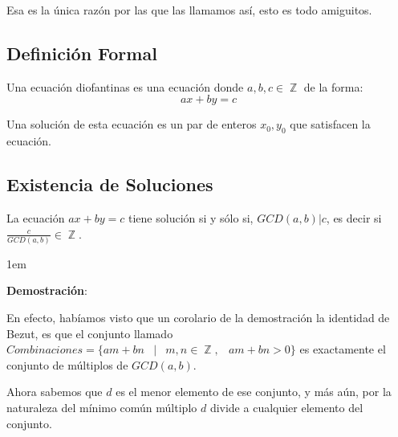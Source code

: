 \documentclass[12pt, fleqn]{report}                             %
\newenvironment{SmallIndentation}[1][0.75em]                    %
    {\begin{adjustwidth}{#1}{}\begin{footnotesize}}                 %
    {\end{footnotesize}\end{adjustwidth}}                           %
\DeclareMathOperator \Space {\quad}                             %
\DeclareMathOperator \MiniSpace {\;}                            %
\newcommand \Such {\MiniSpace|\MiniSpace}                       %
\DeclareMathOperator \Integers  {\mathbb{Z}}                     %
\begin{document}
        Esa es la única razón por las que las llamamos así, esto es todo amiguitos.


        \subsection*{Definición Formal}

            Una ecuación diofantinas es una ecuación donde $a,b,c \in \Integers$ de
            la forma:
            \begin{equation}
                ax + by = c
            \end{equation}

            Una solución de esta ecuación es un par de enteros $x_0, y_0$
            que satisfacen la ecuación.


        \vspace{3.5em}
        \subsection{Existencia de Soluciones}

            La ecuación $ax + by = c$ tiene solución si y sólo si, $GCD(a,b)|c$, es decir
            si $\frac{c}{GCD(a,b)} \in \Integers$.

            \begin{SmallIndentation}[1em]
                \textbf{Demostración}:

                En efecto, habíamos visto que un corolario de la demostración la identidad de Bezut,
                es que el conjunto llamado
                $Combinaciones = \{ am+bn \Such m, n \in \Integers, \MiniSpace am+bn > 0 \}$
                es exactamente el conjunto de múltiplos de $GCD(a, b)$.

                Ahora sabemos que $d$ es el menor elemento de ese conjunto, y más aún,
                por la naturaleza del mínimo común múltiplo $d$ divide a cualquier
                elemento del conjunto.

            \end{SmallIndentation}


        \clearpage
\end{document}
